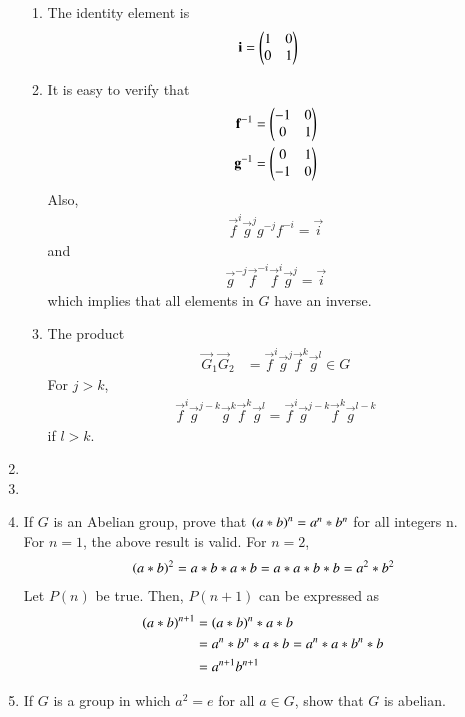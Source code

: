 \begin{enumerate}[label=\arabic*.,ref=\thesubsection.\theenumi]
\begin{enumerate}
	\item The identity element is 
\begin{align}
	\mathbf{i} &= 	\begin{pmatrix}1 & 0\\0 & 1\end{pmatrix}
\end{align}
	\item It is easy to verify that 
\begin{align}
	\mathbf{f}^{-1} &= 	\begin{pmatrix}-1 & 0\\0 & 1\end{pmatrix}
		\\
	\mathbf{g}^{-1} &= 
	\begin{pmatrix}0  & 1\\-1 & 0\end{pmatrix}
\end{align}
Also, 
\begin{align}
	\vec{f}^{i}
	\vec{g}^{j}g^{-j}f^{-i} =\vec{i} 
\end{align}
and 
\begin{align}
	\vec{g}^{-j}\vec{f}^{-i}	\vec{f}^{i}
	\vec{g}^{j} =\vec{i} 
\end{align}
which implies that all elements in $G$ have an inverse.
	\item The product
\begin{align}
	\vec{G}_1 	\vec{G}_2&= \vec{f}^i\vec{g}^j 
  \vec{f}^k\vec{g}^l \in G
\end{align}
For $j > k$,
\begin{align}
	\vec{f}^i\vec{g}^{j-k} \vec{g}^{k}
  \vec{f}^k\vec{g}^l  = 
	\vec{f}^i\vec{g}^{j-k} \vec{f}^{k}
	\vec{g}^{l-k}
\end{align}
if $l > k$.
\end{enumerate}
\item 
\item 
\item If $G$ is an Abelian group, prove that $\left(a*b\right)^n = a^n * b^n$ for all integers n.
	\\
	\solution For $n = 1$, the above result is valid.  For $n = 2$, 
\begin{align}
	\left(a*b\right)^2 = a*b*a*b = a*a*b*b = a^2*b^2
\end{align}
Let $P(n)$ be true.  Then, $P(n+1)$ can be expressed as 
\begin{align}
	\left(a*b\right)^{n+1} &= \left(a*b\right)^{n}*a*b 
	\\
	&= a^n*b^n*a*b = a^n*a*b^n*b 
	\\
	&= a^{n+1}b^{n+1}
\end{align}
\item If $G$ is a group in which $a^2 = e$ for all $a \in G$, show that $G$ is abelian.
	\label{prob:2.1.9}
	\\

\end{enumerate}
